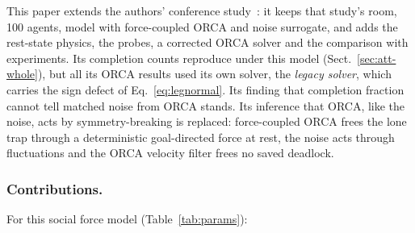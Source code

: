 This paper extends the authors' conference study~\cite{gang2026}: it keeps that study's room, 100 agents, model with force-coupled ORCA and noise surrogate, and adds the rest-state physics, the probes, a corrected ORCA solver and the comparison with experiments. Its completion counts reproduce under this model (Sect.~\ref{sec:att-whole}), but all its ORCA results used its own solver, the \emph{legacy solver}, which carries the sign defect of Eq.~\eqref{eq:legnormal}. Its finding that completion fraction cannot tell matched noise from ORCA stands. Its inference that ORCA, like the noise, acts by symmetry-breaking is replaced: force-coupled ORCA frees the lone trap through a deterministic goal-directed force at rest, the noise acts through fluctuations and the ORCA velocity filter frees no saved deadlock.

\subsubsection{Contributions.}
For this social force model (Table~\ref{tab:params}):

